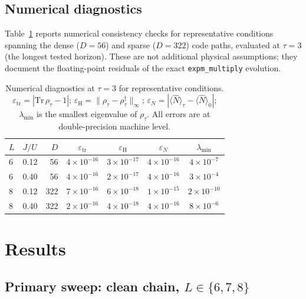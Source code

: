\documentclass[aps,pra,reprint,amsmath,amssymb,longbibliography,floatfix]{revtex4-2}
\begin{document}
\subsection{Numerical diagnostics}
\label{sec:numerics}

Table~\ref{tab:diagnostics} reports numerical consistency checks for
representative conditions spanning the dense ($D=56$) and sparse ($D=322$)
code paths, evaluated at $\tau=3$ (the longest tested horizon).
These are not additional physical assumptions; they document the
floating-point residuals of the exact \texttt{expm\_multiply} evolution.

\begin{table}[tbp]
\centering
\caption{Numerical diagnostics at $\tau=3$ for representative conditions.
$\varepsilon_{\mathrm{tr}}=|\mathrm{Tr}\,\rho_\tau-1|$;
$\varepsilon_{\mathrm{H}}=\|\rho_\tau-\rho_\tau^\dagger\|_\infty$;
$\varepsilon_{N}=|\langle\hat{N}\rangle_\tau-\langle\hat{N}\rangle_0|$;
$\lambda_{\min}$ is the smallest eigenvalue of $\rho_\tau$.
All errors are at double-precision machine level.}
\label{tab:diagnostics}
\begin{ruledtabular}
\begin{tabular}{llrcccc}
$L$ & $J/U$ & $D$ & $\varepsilon_{\mathrm{tr}}$ & $\varepsilon_{\mathrm{H}}$ & $\varepsilon_{N}$ & $\lambda_{\min}$ \\
\hline
6 & 0.12 & 56  & $4\times10^{-16}$ & $3\times10^{-17}$ & $4\times10^{-16}$ & $4\times10^{-7}$  \\
6 & 0.40 & 56  & $4\times10^{-16}$ & $2\times10^{-17}$ & $4\times10^{-16}$ & $3\times10^{-4}$  \\
8 & 0.12 & 322 & $7\times10^{-16}$ & $6\times10^{-18}$ & $1\times10^{-15}$ & $2\times10^{-10}$ \\
8 & 0.40 & 322 & $2\times10^{-16}$ & $4\times10^{-18}$ & $4\times10^{-16}$ & $8\times10^{-6}$  \\
\end{tabular}
\end{ruledtabular}
\end{table}

\section{Results}
\label{sec:results}

\subsection{Primary sweep: clean chain, $L\in\{6,7,8\}$}
\label{sec:primary}
\end{document}
